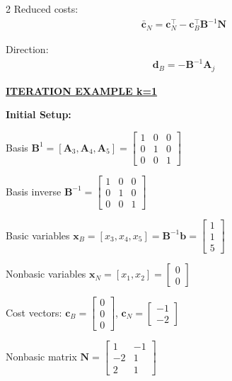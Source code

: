 \documentclass[10pt,a4paper]{article}
\newcommand{\mysection}[1]{\vspace{3pt}\textbf{\underline{#1}}\vspace{2pt}}
\newcommand{\mysubsection}[1]{\vspace{2pt}\textbf{#1:}\vspace{1pt}}
\newcommand{\mb}[1]{\mathbf{#1}}
\begin{document}
\begin{multicols}{2}
Reduced costs:
\begin{align}
\bar{\mb{c}}_N = \mb{c}_N^\top - \mb{c}_B^\top\mb{B}^{-1}\mb{N} \tag{3}
\end{align}

Direction:
\begin{align}
\mb{d}_B = -\mb{B}^{-1}\mb{A}_j \tag{4}
\end{align}

\columnbreak

\mysection{ITERATION EXAMPLE k=1}

\mysubsection{Initial Setup}

Basis $\mb{B}^1 = [\mb{A}_3,\mb{A}_4,\mb{A}_5] = \begin{bmatrix} 1 & 0 & 0 \\ 0 & 1 & 0 \\ 0 & 0 & 1 \end{bmatrix}$

Basis inverse $\mb{B}^{-1} = \begin{bmatrix} 1 & 0 & 0 \\ 0 & 1 & 0 \\ 0 & 0 & 1 \end{bmatrix}$

Basic variables $\mb{x}_B = [x_3, x_4, x_5] = \mb{B}^{-1}\mb{b} = \begin{bmatrix} 1 \\ 1 \\ 5 \end{bmatrix}$

Nonbasic variables $\mb{x}_N = [x_1, x_2] = \begin{bmatrix} 0 \\ 0 \end{bmatrix}$

Cost vectors: $\mb{c}_B = \begin{bmatrix} 0 \\ 0 \\ 0 \end{bmatrix}$, $\mb{c}_N = \begin{bmatrix} -1 \\ -2 \end{bmatrix}$

Nonbasic matrix $\mb{N} = \begin{bmatrix} 1 & -1 \\ -2 & 1 \\ 2 & 1 \end{bmatrix}$


\end{multicols}
\end{document}
